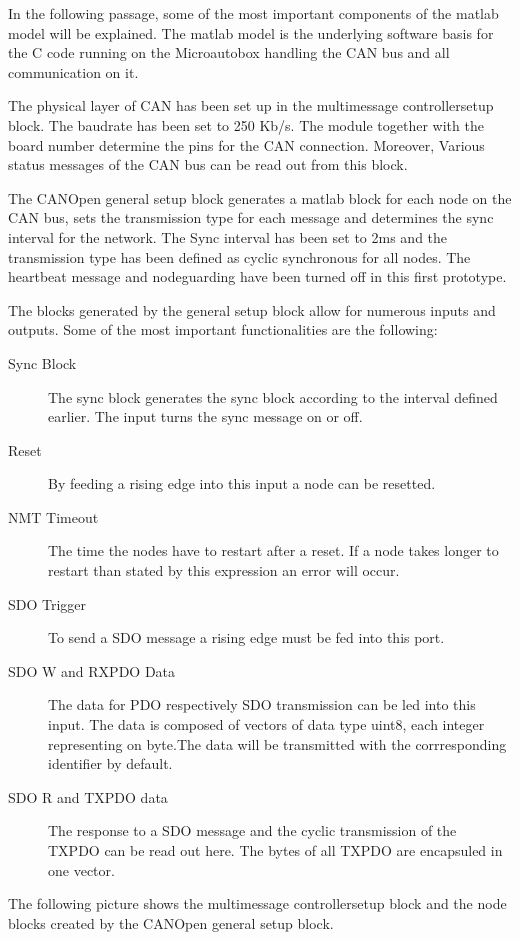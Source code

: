 In the following passage, some of the most important components of the matlab model will be explained. The matlab model is the underlying software basis for the C code running on the Microautobox handling the CAN bus and all communication on it.

The physical layer of CAN has been set up in the multimessage controllersetup block. The baudrate has been set to 250 Kb/s. The module together with the board number determine the pins for the CAN connection. Moreover, Various status messages of the CAN bus can be read out from this block.

The CANOpen general setup block generates a matlab block for each node on the CAN bus, sets the transmission type for each message and determines the sync interval for the network. The Sync interval has been set to 2ms and the transmission type has been defined as cyclic synchronous for all nodes. The heartbeat message and nodeguarding have been turned off in this first prototype.

The blocks generated by the general setup block allow for numerous inputs and outputs. Some of the most important functionalities are the following:

\begin{description}
	\item[Sync Block]
	The sync block generates the sync block according to the interval defined earlier. The input turns the sync message on or off.
	\item[Reset] 
	By feeding a rising edge into this input a node can be resetted. 
	\item[NMT Timeout]
	The time the nodes have to restart after a reset. If a node takes longer to restart than stated by this expression an error will occur.
	\item[SDO Trigger]
	To send a SDO message a rising edge must be fed into this port.  
	\item[SDO W and RXPDO Data] 
	The data for PDO respectively SDO transmission can be led into this input. The data is composed of vectors of data type uint8, each integer representing on byte.The data will be transmitted with the corrresponding identifier by default.
	\item[SDO R and TXPDO data] 
	The response to a SDO message and the cyclic transmission of the TXPDO can be read out here. The bytes of all TXPDO are encapsuled in one vector.
	
\end{description}

The following picture shows the multimessage controllersetup block and the node blocks created by the CANOpen general setup block.


